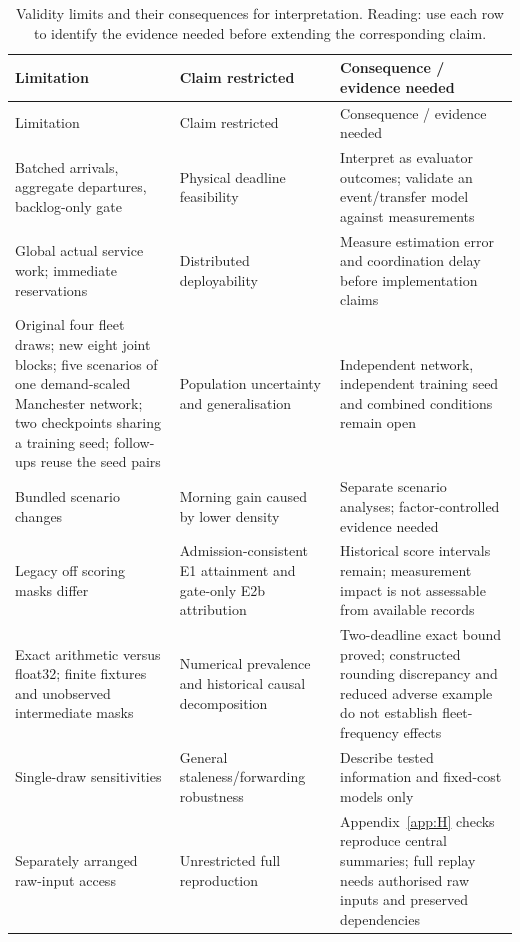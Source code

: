 \documentclass[12pt,a4paper]{article}
\begin{document}
\begingroup
\singlespacing\footnotesize\setlength{\tabcolsep}{3pt}
\renewcommand{\thetable}{8}
\begin{xltabular}{\textwidth}{@{}YYY@{}}
\caption[Validity limits]{Validity limits and their consequences for interpretation. Reading: use each row to identify the evidence needed before extending the corresponding claim.}\label{tab:8} \\
\toprule
Limitation & Claim restricted & Consequence / evidence needed \\
\midrule\endfirsthead
\toprule
Limitation & Claim restricted & Consequence / evidence needed \\
\midrule\endhead
\bottomrule\endfoot
Batched arrivals, aggregate departures, backlog-only gate & Physical deadline feasibility & Interpret as evaluator outcomes; validate an event/transfer model against measurements \\
Global actual service work; immediate reservations & Distributed deployability & Measure estimation error and coordination delay before implementation claims \\
Original four fleet draws; new eight joint blocks; five scenarios of one demand-scaled Manchester network; two checkpoints sharing a training seed; follow-ups reuse the seed pairs & Population uncertainty and generalisation & Independent network, independent training seed and combined conditions remain open \\
Bundled scenario changes & Morning gain caused by lower density & Separate scenario analyses; factor-controlled evidence needed \\
Legacy off scoring masks differ & Admission-consistent E1 attainment and gate-only E2b attribution & Historical score intervals remain; measurement impact is not assessable from available records \\
Exact arithmetic versus float32; finite fixtures and unobserved intermediate masks & Numerical prevalence and historical causal decomposition & Two-deadline exact bound proved; constructed rounding discrepancy and reduced adverse example do not establish fleet-frequency effects \\
Single-draw sensitivities & General staleness/forwarding robustness & Describe tested information and fixed-cost models only \\
Separately arranged raw-input access & Unrestricted full reproduction & Appendix~\ref{app:H} checks reproduce central summaries; full replay needs authorised raw inputs and preserved dependencies \\
\end{xltabular}
\endgroup
\end{document}
